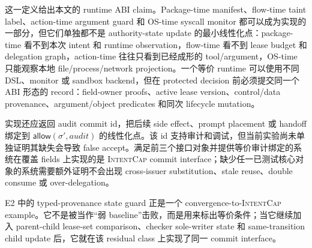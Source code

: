 \documentclass[UTF8,a4paper,11pt]{ctexart}
\newcommand{\sys}{\textsc{IntentCap}\xspace}
\begin{document}
这一定义给出本文的 runtime ABI claim。Package-time manifest、flow-time taint label、action-time argument guard 和 OS-time syscall monitor 都可以成为实现的一部分，但它们单独都不是 authority-state update 的最小线性化点：package-time 看不到本次 intent 和 runtime observation，flow-time 看不到 lease budget 和 delegation graph，action-time 往往只看到已经成形的 tool/argument，OS-time 只能观察本地 file/process/network projection。一个等价 runtime 可以使用不同 DSL、monitor 或 sandbox backend，但在 protected decision 前必须提交同一个 ABI 形态的 record：field-owner proofs、active lease version、control/data provenance、argument/object predicates 和同次 lifecycle mutation。

实现还应返回 audit commit id，把后续 side effect、prompt placement 或 handoff 绑定到 \(\mathsf{allow}(\sigma',audit)\) 的线性化点。该 id 支持审计和调试，但当前实验尚未单独证明其缺失会导致 false accept。满足前三个接口对象并提供等价审计绑定的系统在覆盖 fields 上实现的是 \sys commit interface；缺少任一已测试核心对象的系统需要额外证明不会出现 cross-issuer substitution、stale reuse、double consume 或 over-delegation。

E2 中的 typed-provenance state guard 正是一个 convergence-to-\sys example。它不是被当作“弱 baseline”击败，而是用来标出等价条件；当它继续加入 parent-child lease-set comparison、checker sole-writer state 和 same-transition child update 后，它就在该 residual class 上实现了同一 commit interface。
\end{document}
